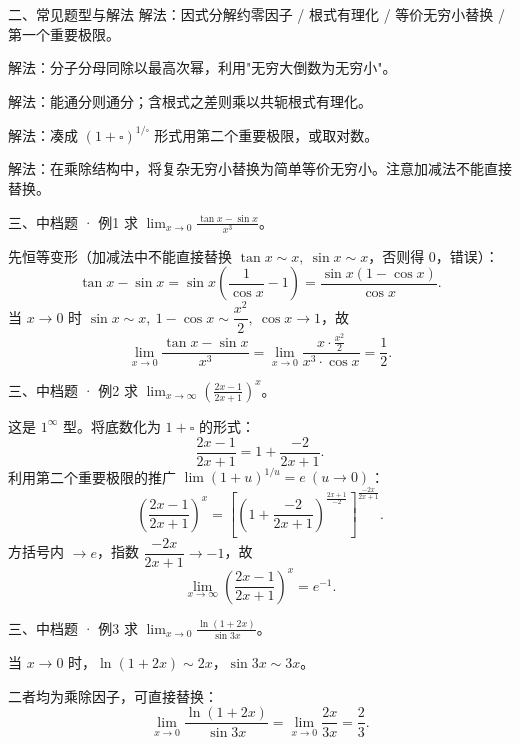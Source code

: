 \documentclass[aspectratio=169,11pt]{beamer}
\begin{document}
\begin{frame}{二、常见题型与解法}
解法：因式分解约零因子 / 根式有理化 / 等价无穷小替换 / 第一个重要极限。

解法：分子分母同除以最高次幂，利用"无穷大倒数为无穷小"。

解法：能通分则通分；含根式之差则乘以共轭根式有理化。

解法：凑成 $(1+\square)^{1/\square}$ 形式用第二个重要极限，或取对数。

解法：在乘除结构中，将复杂无穷小替换为简单等价无穷小。注意加减法不能直接替换。
\end{frame}

\begin{frame}{三、中档题 · 例1}
 求 $\displaystyle\lim_{x\to 0}\frac{\tan x-\sin x}{x^3}$。

 先恒等变形（加减法中不能直接替换 $\tan x\sim x,\ \sin x\sim x$，否则得 $0$，错误）：
\[
\tan x-\sin x=\sin x\left(\frac1{\cos x}-1\right)=\frac{\sin x(1-\cos x)}{\cos x}.
\]
当 $x\to 0$ 时 $\sin x\sim x,\ 1-\cos x\sim \dfrac{x^2}{2},\ \cos x\to 1$，故
\[
\lim_{x\to 0}\frac{\tan x-\sin x}{x^3}
=\lim_{x\to 0}\frac{x\cdot \frac{x^2}{2}}{x^3\cdot \cos x}
=\frac12.
\]


\end{frame}

\begin{frame}{三、中档题 · 例2}
 求 $\displaystyle\lim_{x\to\infty}\left(\frac{2x-1}{2x+1}\right)^x$。

 这是 $1^\infty$ 型。将底数化为 $1+\square$ 的形式：
\[
\frac{2x-1}{2x+1}=1+\frac{-2}{2x+1}.
\]
利用第二个重要极限的推广 $\lim(1+u)^{1/u}=e\ (u\to 0)$：
\[
\left(\frac{2x-1}{2x+1}\right)^x
=\left[\left(1+\frac{-2}{2x+1}\right)^{\frac{2x+1}{-2}}\right]^{\frac{-2x}{2x+1}}.
\]
方括号内 $\to e$，指数 $\dfrac{-2x}{2x+1}\to -1$，故
\[
\lim_{x\to\infty}\left(\frac{2x-1}{2x+1}\right)^x=e^{-1}.
\]

\end{frame}

\begin{frame}{三、中档题 · 例3}
 求 $\displaystyle\lim_{x\to 0}\frac{\ln(1+2x)}{\sin 3x}$。

 当 $x\to 0$ 时，$\ln(1+2x)\sim 2x$，$\sin 3x\sim 3x$。

二者均为乘除因子，可直接替换：
\[
\lim_{x\to 0}\frac{\ln(1+2x)}{\sin 3x}
=\lim_{x\to 0}\frac{2x}{3x}
=\frac23.
\]


\end{frame}
\end{document}

